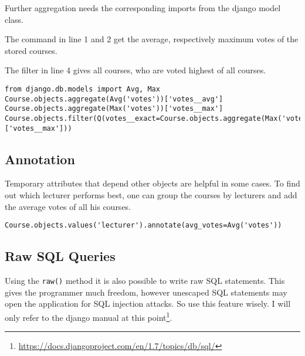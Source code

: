 Further aggregation needs the corresponding imports from the django model class.

The command in line 1 and 2 get the average, respectively maximum votes of the stored courses.

The filter in line 4 gives all courses, who are voted highest of all courses.
\begin{lstlisting}[style=Python, caption=Average and Maximum values of objects, label=lst:objects_aggregations]
from django.db.models import Avg, Max
Course.objects.aggregate(Avg('votes'))['votes__avg']
Course.objects.aggregate(Max('votes'))['votes__max']
Course.objects.filter(Q(votes__exact=Course.objects.aggregate(Max('votes'))['votes__max']))
\end{lstlisting}

\subsection{Annotation}

Temporary attributes that depend other objects are helpful in some cases. To find out which lecturer performs best, one can group the courses by lecturers and add the average votes of all his courses.
\begin{lstlisting}[style=Python, caption=Annotating objects, label=lst:objects_annotations]
Course.objects.values('lecturer').annotate(avg_votes=Avg('votes'))
\end{lstlisting}

\subsection{Raw SQL Queries}
Using the \lstinline|raw()| method it is also possible to write raw SQL statements. This gives the programmer much freedom, however unescaped SQL statements may open the application for SQL injection attacks. So use this feature wisely. I will only refer to the django manual at this point\footnote{\url{https://docs.djangoproject.com/en/1.7/topics/db/sql/}}.